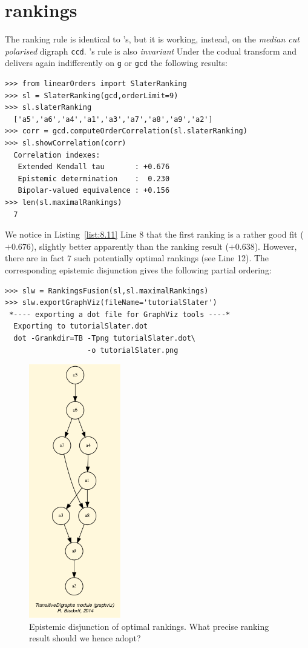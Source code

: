\section{\Slater rankings}
\label{sec:8.5}

The \Slater ranking rule is identical to \Kemeny 's, but it is working, instead, on the \emph{median cut polarised} digraph \texttt{ccd}. \Slater 's rule is also \emph{invariant} Under the codual transform and delivers again indifferently on \texttt{g} or \texttt{gcd} the following results:
\begin{lstlisting}[caption={Computing a \Slater ranking},label=list:8.11]   
>>> from linearOrders import SlaterRanking
>>> sl = SlaterRanking(gcd,orderLimit=9)
>>> sl.slaterRanking
  ['a5','a6','a4','a1','a3','a7','a8','a9','a2']
>>> corr = gcd.computeOrderCorrelation(sl.slaterRanking)
>>> sl.showCorrelation(corr)
  Correlation indexes:
   Extended Kendall tau       : +0.676
   Epistemic determination    :  0.230
   Bipolar-valued equivalence : +0.156
>>> len(sl.maximalRankings)
  7
\end{lstlisting}
We notice in Listing~\ref{list:8.11} Line 8 that the first \Slater ranking is a rather good fit ($+0.676$), slightly better apparently than the \NetFlows ranking result ($+0.638$). However, there are in fact 7 such potentially optimal \Slater rankings (see Line 12). The corresponding epistemic disjunction gives the following partial ordering:
\begin{lstlisting}[caption={Computing the epistemic disjunction of optimal \Slater rankings},label=list:8.12]   
>>> slw = RankingsFusion(sl,sl.maximalRankings)
>>> slw.exportGraphViz(fileName='tutorialSlater')
 *---- exporting a dot file for GraphViz tools ----*
  Exporting to tutorialSlater.dot
  dot -Grankdir=TB -Tpng tutorialSlater.dot\
                   -o tutorialSlater.png
\end{lstlisting}
\begin{figure}[h]
\sidecaption[t]
\includegraphics[width=4cm]{Figures/tutorialSlater.png}
\caption{Epistemic disjunction of optimal \Slater rankings. What precise \Slater ranking result should we hence adopt?}
\label{fig:8.4}       %
\end{figure}
       
